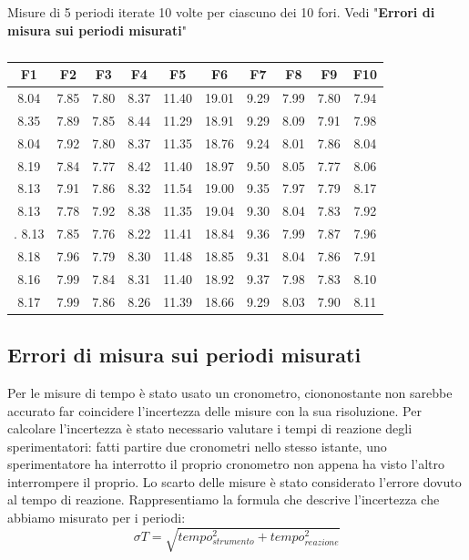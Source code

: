 \documentclass[11pt]{article}
\begin{document}
\begin{table}
    \centering
    \caption{Misure di 5 periodi iterate 10 volte per ciascuno dei 10 fori. Vedi "\textbf {Errori di misura sui periodi misurati}"}
 
    \begin{tabular}{|c|c|c|c|c|c|c|c|c|c|}
        \hline
        \textbf{F1} & \textbf{F2} & \textbf{F3} & \textbf{F4} & \textbf{F5} & \textbf{F6} & \textbf{F7} & \textbf{F8} & \textbf{F9} & \textbf{F10} \\
        \hline
 
  8.04 & 7.85 & 7.80 & 8.37 & 11.40 & 19.01 & 9.29 & 7.99 & 7.80 & 7.94 \\
  8.35 & 7.89 & 7.85 & 8.44 & 11.29 & 18.91 & 9.29 & 8.09 & 7.91 & 7.98 \\
  8.04 & 7.92 & 7.80 & 8.37 & 11.35 & 18.76 & 9.24 & 8.01 & 7.86 & 8.04 \\
  8.19 & 7.84 & 7.77 & 8.42 & 11.40 & 18.97 & 9.50 & 8.05 & 7.77 & 8.06 \\
  8.13 & 7.91 & 7.86 & 8.32 & 11.54 & 19.00 & 9.35 & 7.97 & 7.79 & 8.17 \\
  8.13 & 7.78 & 7.92 & 8.38 & 11.35 & 19.04 & 9.30 & 8.04 & 7.83 & 7.92 \\.
  8.13 & 7.85 & 7.76 & 8.22 & 11.41 & 18.84 & 9.36 & 7.99 & 7.87 & 7.96 \\
  8.18 & 7.96 & 7.79 & 8.30 & 11.48 & 18.85 & 9.31 & 8.04 & 7.86 & 7.91 \\
  8.16 & 7.99 & 7.84 & 8.31 & 11.40 & 18.92 & 9.37 & 7.98 & 7.83 & 8.10 \\
  8.17 & 7.99 & 7.86 & 8.26 & 11.39 & 18.66 & 9.29 & 8.03 & 7.90 & 8.11 \\
 \hline
    \end{tabular}
   \caption{}
\end{table}


\subsection{Errori di misura sui periodi misurati}
Per le misure di tempo è stato usato un cronometro, ciononostante non sarebbe accurato far coincidere l'incertezza delle misure con la sua risoluzione. Per calcolare l'incertezza è stato necessario valutare i tempi di reazione degli sperimentatori: fatti partire due cronometri nello stesso istante, uno sperimentatore ha interrotto il proprio cronometro non appena ha visto l'altro interrompere il proprio. Lo scarto delle misure è stato considerato l'errore dovuto al tempo di reazione.
Rappresentiamo la formula che descrive l'incertezza che abbiamo misurato per i periodi:
\begin{equation}
\sigma  T=\sqrt{tempo_{strumento}^2 + tempo_{reazione}^2}
\end{equation}
\end{document}
